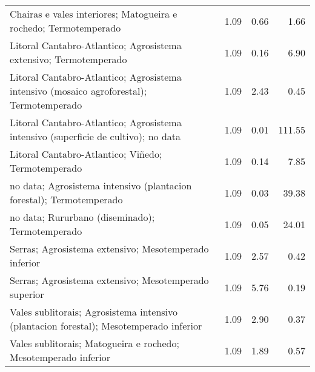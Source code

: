 \begin{table}[p]
\begin{tabular}{lrrr}
  Chairas e vales interiores; Matogueira e rochedo; Termotemperado & 1.09 & 0.66 & 1.66 \\ 
  Litoral Cantabro-Atlantico; Agrosistema extensivo; Termotemperado & 1.09 & 0.16 & 6.90 \\ 
  Litoral Cantabro-Atlantico; Agrosistema intensivo (mosaico agroforestal); Termotemperado & 1.09 & 2.43 & 0.45 \\ 
  Litoral Cantabro-Atlantico; Agrosistema intensivo (superficie de cultivo); no data & 1.09 & 0.01 & 111.55 \\ 
  Litoral Cantabro-Atlantico; Viñedo; Termotemperado & 1.09 & 0.14 & 7.85 \\ 
  no data; Agrosistema intensivo (plantacion forestal); Termotemperado & 1.09 & 0.03 & 39.38 \\ 
  no data; Rururbano (diseminado); Termotemperado & 1.09 & 0.05 & 24.01 \\ 
  Serras; Agrosistema extensivo; Mesotemperado inferior & 1.09 & 2.57 & 0.42 \\ 
  Serras; Agrosistema extensivo; Mesotemperado superior & 1.09 & 5.76 & 0.19 \\ 
  Vales sublitorais; Agrosistema intensivo (plantacion forestal); Mesotemperado inferior & 1.09 & 2.90 & 0.37 \\ 
  Vales sublitorais; Matogueira e rochedo; Mesotemperado inferior & 1.09 & 1.89 & 0.57 \\ 
   \hline
\end{tabular}
\end{table}
